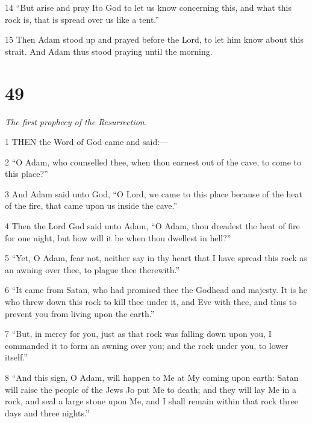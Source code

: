 \par 14 “But arise and pray Ito God to let us know concerning this, and what this rock is, that is spread over us like a tent.”

\par 15 Then Adam stood up and prayed before the Lord, to let him know about this strait. And Adam thus stood praying until the morning.

\chapter{49}

\par \textit{The first prophecy of the Resurrection.}

\par 1 THEN the Word of God came and said:—

\par 2 “O Adam, who counselled thee, when thou earnest out of the cave, to come to this place?”

\par 3 And Adam said unto God, “O Lord, we came to this place because of the heat of the fire, that came upon us inside the cave.”

\par 4 Then the Lord God said unto Adam, “O Adam, thou dreadest the heat of fire for one night, but how will it be when thou dwellest in hell?”

\par 5 “Yet, O Adam, fear not, neither say in thy heart that I have spread this rock as an awning over thee, to plague thee therewith.”

\par 6 “It came from Satan, who had promised thee the Godhead and majesty. It is he who threw down this rock to kill thee under it, and Eve with thee, and thus to prevent you from living upon the earth.”

\par 7 “But, in mercy for you, just as that rock was falling down upon you, I commanded it to form an awning over you; and the rock under you, to lower itself.”

\par 8 “And this sign, O Adam, will happen to Me at My coming upon earth: Satan will raise the people of the Jews Jo put Me to death; and they will lay Me in a rock, and seal a large stone upon Me, and I shall remain within that rock three days and three nights.”

